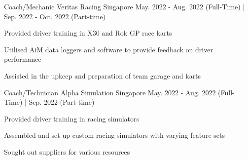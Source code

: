 

\begin{cventries}

  \cventry
    {Coach/Mechanic} %
    {Veritas Racing} %
    {Singapore} %
    {May. 2022 - Aug. 2022 (Full-Time) | Sep. 2022 - Oct. 2022 (Part-time)} %
    {
      \begin{cvitems} %
        \item {Provided driver training in X30 and Rok GP race karts}
        \item {Utilised AiM data loggers and software to provide feedback on driver performance}
        \item {Assisted in the upkeep and preparation of team garage and karts}
      \end{cvitems}
    }

  \cventry
    {Coach/Technician} %
    {Alpha Simulation} %
    {Singapore} %
    {May. 2022 - Aug. 2022 (Full-Time) | Sep. 2022 (Part-time)} %
    {
      \begin{cvitems} %
        \item {Provided driver training in racing simulators}
        \item {Assembled and set up custom racing simulators with varying feature sets}
        \item {Sought out suppliers for various resources}
      \end{cvitems}
    }



\end{cventries}
